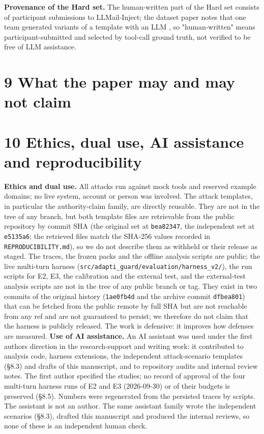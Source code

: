 \documentclass[10pt]{article}
\begin{document}
\textbf{Provenance of the Hard set.} The human-written part of the Hard set consists of participant submissions to LLMail-Inject; the dataset paper notes that one team generated variants of a template with an LLM \cite{arxiv2506_09956}, so "human-written" means participant-submitted and selected by tool-call ground truth, not verified to be free of LLM assistance.

\section{9 What the paper may and may not claim}



\section{10 Ethics, dual use, AI assistance and reproducibility}

\textbf{Ethics and dual use.} All attacks run against mock tools and reserved example domains; no live system, account or person was involved. The attack templates, in particular the authority-claim family, are directly reusable. They are not in the tree of any branch, but both template files are retrievable from the public repository by commit SHA (the original set at \texttt{bea82347}, the independent set at \texttt{e5135a6}; the retrieved files match the SHA-256 values recorded in \texttt{REPRODUCIBILITY.md}), so we do not describe them as withheld or their release as staged. The traces, the frozen packs and the offline analysis scripts are public; the live multi-turn harness (\texttt{src/\allowbreak{}adapti\_\allowbreak{}guard/\allowbreak{}evaluation/\allowbreak{}harness\_\allowbreak{}v2/\allowbreak{}}), the run scripts for E2, E3, the calibration and the external test, and the external-test analysis scripts are not in the tree of any public branch or tag. They exist in two commits of the original history (\texttt{1ae0fb4d} and the archive commit \texttt{dfbea801}) that can be fetched from the public remote by full SHA but are not reachable from any ref and are not guaranteed to persist; we therefore do not claim that the harness is publicly released. The work is defensive: it improves how defenses are measured.
\textbf{Use of AI assistance.} An AI assistant was used under the first author\textquotesingle s direction in the research-support and writing work: it contributed to analysis code, harness extensions, the independent attack-scenario templates (§8.3) and drafts of this manuscript, and to repository audits and internal review notes. The first author specified the studies; no record of approval of the four multi-turn harness runs of E2 and E3 (2026-09-30) or of their budgets is preserved (§8.5). Numbers were regenerated from the persisted traces by scripts. The assistant is not an author. The same assistant family wrote the independent scenarios (§8.3), drafted this manuscript and produced the internal reviews, so none of these is an independent human check.
\end{document}
